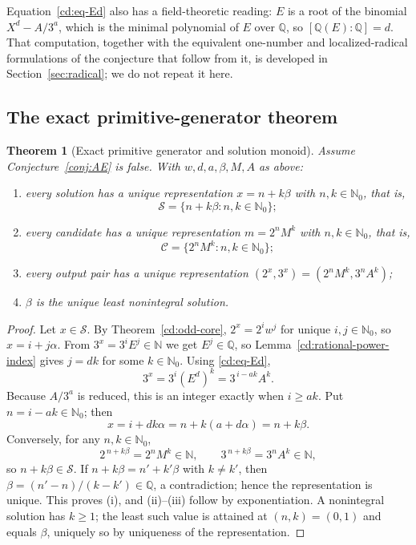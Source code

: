 \documentclass[11pt,oneside]{article}
\newtheorem{theorem}{Theorem}[section]
\theoremstyle{definition}
\theoremstyle{remark}
\newcommand{\N}{\mathbb N}
\newcommand{\Nzero}{\mathbb N_0}
\newcommand{\Q}{\mathbb Q}
\newcommand{\Sol}{\mathcal S}
\newcommand{\Cand}{\mathcal C}
\begin{document}
Equation~\eqref{cd:eq-Ed} also has a field-theoretic reading: $E$ is a root of the binomial
$X^d-A/3^a$, which is the minimal polynomial of $E$ over $\Q$, so $[\Q(E):\Q]=d$.  That
computation, together with the equivalent one-number and localized-radical formulations of the
conjecture that follow from it, is developed in Section~\ref{sec:radical}; we do not repeat it
here.

\subsection{The exact primitive-generator theorem}

\begin{theorem}[Exact primitive generator and solution monoid]
\label{cd:generator}
Assume Conjecture~\ref{conj:AE} is false.  With $w,d,a,\beta,M,A$ as above:
\begin{enumerate}[label=\textup{(\roman*)}]
\item every solution has a unique representation $x=n+k\beta$ with $n,k\in\Nzero$, that is,
\[
 \Sol=\{n+k\beta:n,k\in\Nzero\};
\]
\item every candidate has a unique representation $m=2^nM^k$ with $n,k\in\Nzero$, that is,
\[
 \Cand=\{2^nM^k:n,k\in\Nzero\};
\]
\item every output pair has a unique representation $(2^x,3^x)=(2^nM^k,3^nA^k)$;
\item $\beta$ is the unique least nonintegral solution.
\end{enumerate}
\end{theorem}

\begin{proof}
Let $x\in\Sol$.  By Theorem~\ref{cd:odd-core}, $2^x=2^iw^j$ for unique $i,j\in\Nzero$, so
$x=i+j\alpha$.  From $3^x=3^iE^j\in\N$ we get $E^j\in\Q$, so Lemma~\ref{cd:rational-power-index}
gives $j=dk$ for some $k\in\Nzero$.  Using \eqref{cd:eq-Ed},
\[
3^x=3^i(E^d)^k=3^{\,i-ak}A^k .
\]
Because $A/3^a$ is reduced, this is an integer exactly when $i\ge ak$.  Put $n=i-ak\in\Nzero$;
then
\[
x=i+dk\alpha=n+k(a+d\alpha)=n+k\beta .
\]
Conversely, for any $n,k\in\Nzero$,
\[
2^{\,n+k\beta}=2^nM^k\in\N,\qquad 3^{\,n+k\beta}=3^nA^k\in\N,
\]
so $n+k\beta\in\Sol$.  If $n+k\beta=n'+k'\beta$ with $k\ne k'$, then $\beta=(n'-n)/(k-k')\in\Q$,
a contradiction; hence the representation is unique.  This proves (i), and (ii)--(iii) follow by
exponentiation.  A nonintegral solution has $k\ge1$; the least such value is attained at
$(n,k)=(0,1)$ and equals $\beta$, uniquely so by uniqueness of the representation.
\end{proof}
\end{document}
